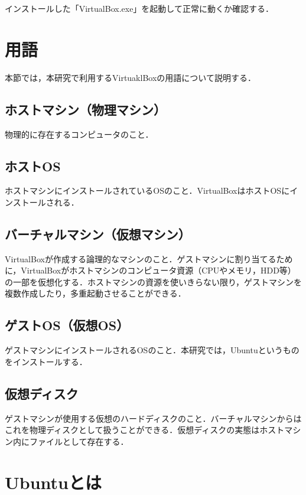 インストールした「VirtualBox.exe」を起動して正常に動くか確認する．






\section{用語}

本節では，本研究で利用するVirtuaklBoxの用語について説明する．


\subsection{ホストマシン（物理マシン）}

物理的に存在するコンピュータのこと．

\subsection{ホストOS}

ホストマシンにインストールされているOSのこと．VirtualBoxはホストOSにインストールされる．

\subsection{バーチャルマシン（仮想マシン）}

VirtualBoxが作成する論理的なマシンのこと．ゲストマシンに割り当てるために，VirtualBoxがホストマシンのコンピュータ資源（CPUやメモリ，HDD等）の一部を仮想化する．ホストマシンの資源を使いきらない限り，ゲストマシンを複数作成したり，多重起動させることができる．

\subsection{ゲストOS（仮想OS）}

ゲストマシンにインストールされるOSのこと．本研究では，Ubuntuというものをインストールする．

\subsection{仮想ディスク}

ゲストマシンが使用する仮想のハードディスクのこと．バーチャルマシンからはこれを物理ディスクとして扱うことができる．仮想ディスクの実態はホストマシン内にファイルとして存在する．



\section{Ubuntuとは}

